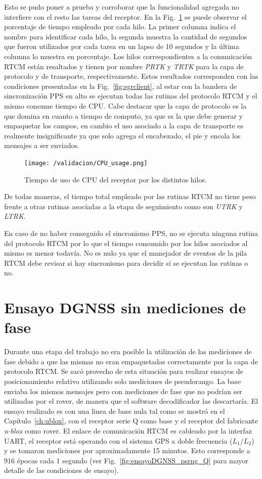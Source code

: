 \documentclass[a4paper,12pt,oneside,onecolumn,final,openright]{book}%
\begin{document}
	Esto se pudo poner a prueba y corroborar que la funcionalidad agregada no interfiere con el resto las tareas del receptor. En la Fig.~\ref{fig:CPU_usage} se puede observar el porcentaje de tiempo empleado por cada hilo. La primer columna indica el nombre para identificar cada hilo, la segunda muestra la cantidad de segundos que fueron utilizados por cada tarea en un lapso de 10 segundos y la última columna lo muestra en porcentaje. Los hilos correspondientes a la comunicación RTCM están resaltados y tienen por nombre \textit{PRTK} y \textit{TRTK} para la capa de protocolo y de transporte, respectivamente. Estos resultados corresponden con las condiciones presentadas en la Fig.~\ref{fig:sgrclient}, al estar con la bandera de sincronización PPS en alto se ejecutan todas las rutinas del protocolo RTCM y el mismo consume tiempo de CPU. Cabe destacar que la capa de protocolo es la que domina en cuanto a tiempo de computo, ya que es la que debe generar y empaquetar los campos, en cambio el uso asociado a la capa de transporte es realmente insignificante ya que solo agrega el encabezado, el pie y encola los mensajes a ser enviados. 
\begin{figure}
    \centering
	\texttt{[image: /validacion/CPU\_usage.png]}
    \caption{Tiempo de uso de CPU del receptor por los distintos hilos.}
    \label{fig:CPU_usage}
\end{figure}
	De todas maneras, el tiempo total empleado por las rutinas RTCM no tiene peso frente a otras rutinas asociadas a la etapa de seguimiento como son \textit{UTRK} y \textit{LTRK}.
	
	En caso de no haber conseguido el sincronismo PPS, no se ejecuta ninguna rutina del protocolo RTCM por lo que el tiempo consumido por los hilos asociados al mismo es menor todavía. No es nulo ya que el manejador de eventos de la pila RTCM debe revisar si hay sincronismo para decidir si se ejecutan las rutinas o no.
\section{Ensayo DGNSS sin mediciones de fase}
	Durante una etapa del trabajo no era posible la utilización de las mediciones de fase debido a que las mismas no eran empaquetadas correctamente por la capa de protocolo RTCM. Se sacó provecho de esta situación para realizar ensayos de posicionamiento relativo utilizando solo mediciones de pseudorango. La base enviaba los mismos mensajes pero con mediciones de fase que no podrían ser utilizadas por el rover, de manera que el software decodificador las descartaría. El ensayo realizado es con una linea de base nula tal como se mostró en el Capítulo~\ref{ch:ublox}, con el receptor serie Q como base y el receptor del fabricante \textit{u-blox} como rover. El enlace de comunicación RTCM es cableado por la interfaz UART, el receptor está operando con el sistema GPS a doble frecuencia ($L_1/L_2$) y se tomaron mediciones por aproximadamente 15 minutos. Esto corresponde a 916 épocas cada 1 segundo (ver Fig.~\ref{fig:ensayoDGNSS_psrng_Q} para mayor detalle de las condiciones de ensayo).
	
\end{document}
